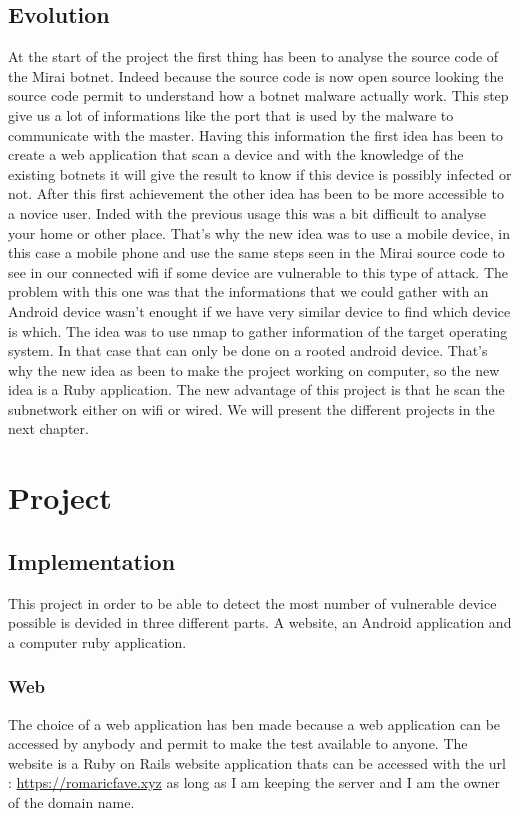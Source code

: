 \documentclass{report}
\begin{document}
\section{Evolution}
At the start of the project the first thing has been to analyse the source code of the Mirai botnet. Indeed because the source code is now open source looking the source code permit to understand how a botnet malware actually work. This step give us a lot of informations like the port that is used by the malware to communicate with the master.\newline
Having this information the first idea has been to create a web application that scan a device and with the knowledge of the existing botnets it will give the result to know if this device is possibly infected or not.\newline
After this first achievement the other idea has been to be more accessible to a novice user. Inded with the previous usage this was a bit difficult to analyse your home or other place.\newline
That's why the new idea was to use a mobile device, in this case a mobile phone and use the same steps seen in the Mirai source code to see in our connected wifi if some device are vulnerable to this type of attack.\newline
The problem with this one was that the informations that we could gather with an Android device wasn't enought if we have very similar device to find which device is which. The idea was to use nmap to gather information of the target operating system. In that case that can only be done on a rooted android device. That's why the new idea as been to make the project working on computer, so the new idea is a Ruby application. The new advantage of this project is that he scan the subnetwork either on wifi or wired.\newline
We will present the different projects in the next chapter.

\chapter{Project}
\section{Implementation}
This project in order to be able to detect the most number of vulnerable device possible is devided in three different parts. A website, an Android application and a computer ruby application.
\subsection{Web}
The choice of a web application has ben made because a web application can be accessed by anybody and permit to make the test available to anyone. The website is a Ruby on Rails website application thats can be accessed with the url : \url{https://romaricfave.xyz} as long as I am keeping the server and I am the owner of the domain name.\newline
\end{document}
